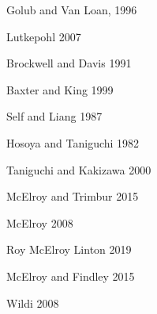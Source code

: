 \documentclass[a4paper]{book}
\begin{document}
\begin{thebibliography}{}

\bibitem{} Golub and Van Loan, 1996

\bibitem{}  Lutkepohl 2007

\bibitem{}  Brockwell and Davis 1991

\bibitem{} Baxter and King 1999

\bibitem{} Self and Liang 1987

\bibitem{} Hosoya and Taniguchi 1982

\bibitem{} Taniguchi and Kakizawa 2000

\bibitem{} McElroy and Trimbur 2015

\bibitem{} McElroy 2008

\bibitem{} Roy McElroy Linton 2019

\bibitem{} McElroy and Findley 2015

\bibitem{} Wildi 2008




\end{thebibliography}
\end{document}
